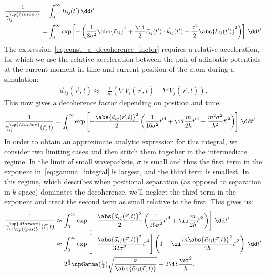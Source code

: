 \begin{align}\label{eq:gamma_integral}
\frac1{\gamma_{ij}^\up{Markov}} &= 
  \int_0^\infty R_{ij}(t^\prime) \,\dd t^\prime\\
&= \int_0^\infty \exp\left[-\left(\frac1{8\sigma^2}\abs{\vec r_{ij}}^2
+ \frac\ii 2 \vec r_{ij}(t^\prime) \cdot \vec k_{ij}(t^\prime) + \frac{\sigma^2}{2} \abs{\vec k_{ij}(t^\prime)}^2
\right)\right]\,\dd t^\prime
\end{align}
The expression~\eqref{eq:const_a_decoherence_factor} requires a relative acceleration, for which we use the relative acceleration between the pair of adiabatic potentials at the current moment in time and current position of the atom during a simulation:
\begin{align}
\vec a_{ij}(\vec r, t) \approx -\frac1 m\left(\nabla V_i(\vec r, t) - \nabla V_j(\vec r, t)\right).
\end{align}
This now gives a decoherence factor depending on position and time:
\begin{align}
\frac1{\gamma_{ij}^\up{Markov}(\vec r, t)} &=
  \int_0^\infty 
    \exp\left[
      -\frac {\abs{\vec a_{ij}(\vec r, t)}^2} 2 \left(\frac1 {16\sigma^2}{t^\prime}^4 + \ii\frac m{2\hbar}{t^\prime}^3 + \frac{m^2\sigma^2}{\hbar^2} {t^\prime}^2 \right)
      \right]
    \,\dd t^\prime\label{eq:markov_decoherence_factor_time_dep}
\end{align}
In order to obtain an approximate analytic expression for this integral, we consider two limiting cases and then stitch them together in the intermediate regime. In the limit of small wavepackets, $\sigma$ is small and thus the first term in the exponent in~\eqref{eq:gamma_integral} is largest, and the third term is smallest. In this regime, which describes when positional separation (as opposed to separation in $k$-space) dominates the decoherence, we'll neglect the third term in the exponent and treat the second term as small relative to the first.
This gives us:
\begin{align}
\frac1{\gamma_{ij\,\up{(pos)}}^\up{Markov}(\vec r, t)} &\approx 
  \int_0^\infty 
    \exp\left[
      -\frac {\abs{\vec a_{ij}(\vec r, t)}^2} 2 \left(\frac1 {16\sigma^2}{t^\prime}^4 + \ii\frac m{2\hbar}{t^\prime}^3\right)
      \right]
    \,\dd t^\prime\\
      &\approx \int_0^\infty \exp\left[-
              \frac{\abs{\vec a_{ij}(\vec r, t)}^2} {32\sigma^2} {t^\prime}^4\right]\left(1 -\ii \frac {m\abs{\vec a_{ij}(\vec r, t)}^2}{4\hbar} {t^\prime}^3\right)\, \dd t^\prime\label{eq:gamma_pos_exp}\\
      &= 2^{\frac54}\upGamma(\tfrac54)\sqrt{\frac{\sigma}{\abs{\vec a_{ij}(\vec r, t)}}} - 2\ii\frac{m \sigma^2}{\hbar},\label{eq:gamma_pos_recip}
\end{align}
